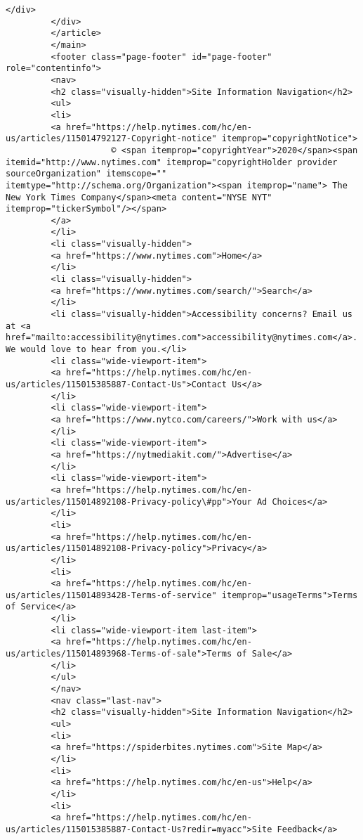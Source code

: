 \documentclass[11pt]{article}
\begin{document}
\begin{Verbatim}[commandchars=\\\{\}]
         </div>
         </div>
         </article>
         </main>
         <footer class="page-footer" id="page-footer" role="contentinfo">
         <nav>
         <h2 class="visually-hidden">Site Information Navigation</h2>
         <ul>
         <li>
         <a href="https://help.nytimes.com/hc/en-us/articles/115014792127-Copyright-notice" itemprop="copyrightNotice">
                     © <span itemprop="copyrightYear">2020</span><span itemid="http://www.nytimes.com" itemprop="copyrightHolder provider sourceOrganization" itemscope="" itemtype="http://schema.org/Organization"><span itemprop="name"> The New York Times Company</span><meta content="NYSE NYT" itemprop="tickerSymbol"/></span>
         </a>
         </li>
         <li class="visually-hidden">
         <a href="https://www.nytimes.com">Home</a>
         </li>
         <li class="visually-hidden">
         <a href="https://www.nytimes.com/search/">Search</a>
         </li>
         <li class="visually-hidden">Accessibility concerns? Email us at <a href="mailto:accessibility@nytimes.com">accessibility@nytimes.com</a>. We would love to hear from you.</li>
         <li class="wide-viewport-item">
         <a href="https://help.nytimes.com/hc/en-us/articles/115015385887-Contact-Us">Contact Us</a>
         </li>
         <li class="wide-viewport-item">
         <a href="https://www.nytco.com/careers/">Work with us</a>
         </li>
         <li class="wide-viewport-item">
         <a href="https://nytmediakit.com/">Advertise</a>
         </li>
         <li class="wide-viewport-item">
         <a href="https://help.nytimes.com/hc/en-us/articles/115014892108-Privacy-policy\#pp">Your Ad Choices</a>
         </li>
         <li>
         <a href="https://help.nytimes.com/hc/en-us/articles/115014892108-Privacy-policy">Privacy</a>
         </li>
         <li>
         <a href="https://help.nytimes.com/hc/en-us/articles/115014893428-Terms-of-service" itemprop="usageTerms">Terms of Service</a>
         </li>
         <li class="wide-viewport-item last-item">
         <a href="https://help.nytimes.com/hc/en-us/articles/115014893968-Terms-of-sale">Terms of Sale</a>
         </li>
         </ul>
         </nav>
         <nav class="last-nav">
         <h2 class="visually-hidden">Site Information Navigation</h2>
         <ul>
         <li>
         <a href="https://spiderbites.nytimes.com">Site Map</a>
         </li>
         <li>
         <a href="https://help.nytimes.com/hc/en-us">Help</a>
         </li>
         <li>
         <a href="https://help.nytimes.com/hc/en-us/articles/115015385887-Contact-Us?redir=myacc">Site Feedback</a>

\end{Verbatim}
\end{document}
